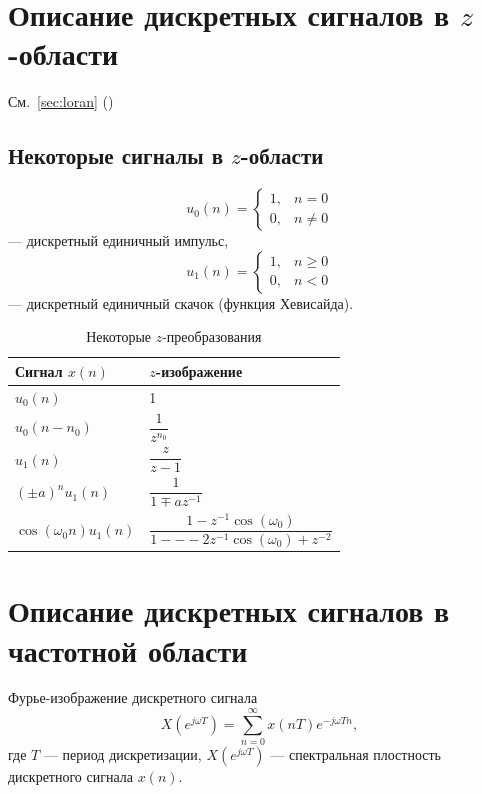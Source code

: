 \documentclass[a4paper, 14pt]{extarticle}
\begin{document}
\section{Описание дискретных сигналов в $z$-области}
См.~\ref{sec:loran} ()

\subsection{Некоторые сигналы в $z$-области}
\begin{equation}
    u_0(n) = \begin{cases}
        1, &n=0\\
        0, &n\ne 0
    \end{cases}
\end{equation}
--- дискретный единичный импульс,
\begin{equation}
    u_1(n) = \begin{cases}
        1, &n \ge 0\\
        0, &n < 0
    \end{cases}
\end{equation}
--- дискретный единичный скачок (функция Хевисайда).
\begin{table}[h]
    \centering
    \caption{Некоторые $z$-преобразования}
    \begin{tabular}{@{}ll@{}}
        \toprule
        \textbf{Сигнал $x(n)$} & $z$-изображение \\ \midrule
        $u_0(n)$ & 1 \\[6pt]
        $u_0(n-n_0)$ & $ \dfrac{1}{z^{n_0}} $ \\[12pt]
        $u_1(n)$ & $ \dfrac{z}{z-1} $ \\[12pt]
        ${(\pm a)}^n u_1(n)$ & $ \dfrac{1}{1 \mp az^{-1}} $ \\[12pt]
        $\cos( \omega_0 n ) u_1(n)$ & $ \dfrac{1 - z^{-1} \cos( \omega_0 )}{1 ---  2z^{-1} \cos( \omega_0 ) + z^{-2}} $ \\ \bottomrule
    \end{tabular}
\end{table}

\section{Описание дискретных сигналов в частотной области}
Фурье-изображение дискретного сигнала
\begin{equation}
    X(e^{j \omega T}) = \sum^{\infty}_{n=0} x(nT)e^{-j \omega Tn},
\end{equation}
где $T$ --- период дискретизации, $X(e^{j \omega T})$ --- спектральная плостность дискретного сигнала $x(n)$.
\end{document}
